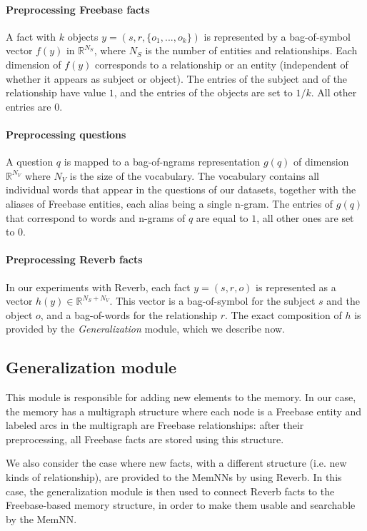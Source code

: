 \documentclass[11pt,a4paper]{article}
\newcommand{\fb}{{\sf Freebase}\xspace}
\newcommand{\rv}{{\sf Reverb}\xspace}
\renewcommand{\Re}{\mathbb{R}}
\newcommand{\phifact}{f}
\newcommand{\phiq}{g}
\newcommand{\fact}{y}
\newcommand{\rvfact}{y}
\newcommand{\sub}{s}
\newcommand{\rel}{r}
\newcommand{\obj}{o}
\newcommand{\ques}{q}
\begin{document}
\paragraph{Preprocessing Freebase facts}
A fact with $k$ objects $\fact = (\sub, \rel, \{\obj_1, ...,
\obj_k\})$ is represented by a bag-of-symbol vector $\phifact(\fact)$
in $\Re^{N_S}$, where $N_S$ is the number of entities and
relationships. Each dimension of $\phifact(\fact)$ corresponds
to a relationship or an entity (independent of whether it appears as
subject or object). The entries of the subject and of the
relationship have value $1$, and the entries of the objects are set to
$1/k$. All other entries are $0$.

\paragraph{Preprocessing questions}
A question $\ques$ is mapped to a bag-of-ngrams representation
$\phiq(\ques)$ of dimension $\Re^{N_V}$ where $N_V$ is the size of the
vocabulary. The vocabulary contains all individual words that appear
in the questions of our datasets, together with the aliases of \fb
entities, each alias being a single n-gram. The entries of
$\phiq(\ques)$ that correspond to words and n-grams of $\ques$ are
equal to $1$, all other ones are set to $0$.



\paragraph{Preprocessing Reverb facts}
In our experiments with \rv, each fact $\rvfact = (\sub, \rel, \obj)$
is represented as a vector $h(\rvfact)\in\Re^{N_S+N_V}$. This vector is a
bag-of-symbol for the subject $\sub$ and the object $\obj$, and a
bag-of-words for the relationship $\rel$. The exact composition of $h$
is
provided by the {\it Generalization} module, which we describe now.


\subsection{Generalization module}

This module is responsible for adding new elements to the memory. In
our case, the memory has a multigraph structure where each node is a
\fb entity and labeled arcs in the multigraph are \fb relationships:
after their preprocessing, all \fb facts are stored using this structure.

We also consider the case where new facts, with a different structure
(i.e. new kinds of relationship), are provided to the MemNNs by using
\rv.
In this case, the generalization module is then used to connect \rv
facts to the \fb-based memory structure, in order to make them usable
and searchable by the MemNN.
\end{document}
